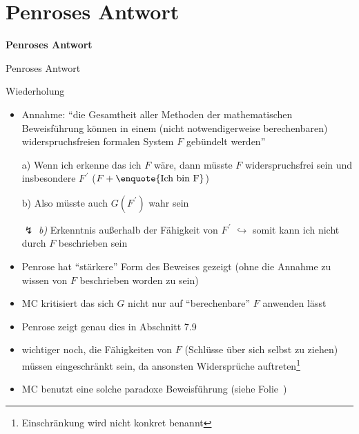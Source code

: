 %
%

\section{Penroses Antwort}
\label{sec:penrose_answer}

\begin{frame}
    \vspace*{\fill}
        \begin{center}
            \Huge \textbf{Penroses Antwort}
        \end{center}
    \vspace*{\fill}
\end{frame}

\begin{frame}{Penroses Antwort \cite{penrose1996beyond}}
    \begin{block}{Wiederholung}
        \begin{itemize}
            \item Annahme: \enquote{die Gesamtheit aller Methoden der mathematischen Beweisführung können in einem (nicht notwendigerweise berechenbaren) widerspruchsfreien formalen System $F$ gebündelt werden}
        \end{itemize}
    \end{block}
    \begin{itemize}
        \item[a)] Wenn ich erkenne das ich $F$ wäre, dann müsste $F$ widerspruchsfrei sein und insbesondere $F^{\,'}$ ($F+\text{\enquote{Ich bin F}}$)
        \item[b)] Also müsste auch $G(F^{\,'})$ wahr sein
        \item[$\lightning$] \emph{b)} Erkenntnis außerhalb der Fähigkeit von $F^{\,'}$ $\hookrightarrow$ somit kann ich nicht durch $F$ beschrieben sein
        \item Penrose hat \enquote{stärkere} Form des Beweises gezeigt (ohne die Annahme zu wissen von $F$ beschrieben worden zu sein)
    \end{itemize}
\end{frame}

\begin{frame}
    \begin{itemize}
        \item MC kritisiert das sich $G$ nicht nur auf \enquote{berechenbare} $F$ anwenden lässt
        \item Penrose zeigt genau dies in Abschnitt 7.9
        \item wichtiger noch, die Fähigkeiten von $F$ (Schlüsse über sich selbst zu ziehen) müssen eingeschränkt sein, da ansonsten Widersprüche auftreten\footnote{Einschränkung wird nicht konkret benannt}
        \item MC benutzt eine solche paradoxe Beweisführung (siehe Folie~\pageref{sec:quick_and_dirty})
    \end{itemize}
\end{frame}

